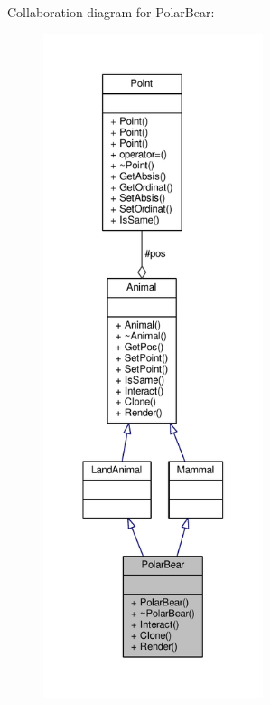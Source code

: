 Collaboration diagram for Polar\+Bear\+:
\nopagebreak
\begin{figure}[H]
\begin{center}
\leavevmode
\includegraphics[height=550pt]{classPolarBear__coll__graph}
\end{center}
\end{figure}
